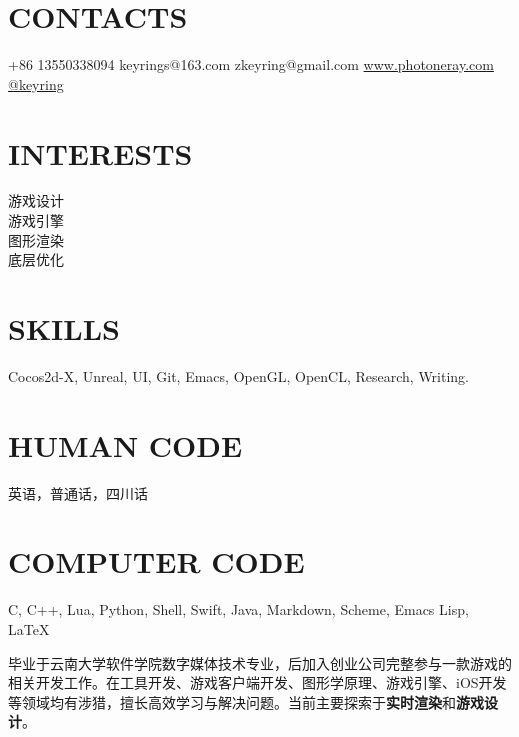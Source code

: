 \documentclass[full]{rvca}
\begin{document}


\begin{aside} %
\section{\uppercase{contacts}}
+86 13550338094 {\faMobile}
keyrings@163.com {\scriptsize\faLink}
zkeyring@gmail.com {\scriptsize\faLink}
\href{http://www.photoneray.com}{\color{sidebandtextcolor}www.photoneray.com \faGlobe} 
\href{https://github.com/keyring}{\color{sidebandtextcolor}@keyring \faGithub}
\ghost
\section{\uppercase{interests}}
游戏设计\\游戏引擎\\图形渲染\\底层优化
%
\ghost
\section{\uppercase{skills}}
{\scriptsize\faHeart}Cocos2d-X, Unreal, UI, Git, Emacs, OpenGL, OpenCL, Research, Writing.
\ghost 
\section{\uppercase{human code}}
英语，普通话，四川话
\ghost
\section{\uppercase{computer code}}
{\scriptsize\faHeart}C, C++, {\scriptsize\faHeart}Lua, Python, Shell, Swift, Java, Markdown, Scheme, Emacs Lisp, \LaTeX
\ghost
\end{aside}



\begin{statement}
毕业于云南大学软件学院数字媒体技术专业，后加入创业公司完整参与一款游戏的相关开发工作。在工具开发、游戏客户端开发、图形学原理、游戏引擎、iOS开发等领域均有涉猎，擅长高效学习与解决问题。当前主要探索于\textbf{实时渲染}和\textbf{游戏设计}。
\end{statement}

\subsection{}
\end{document}
